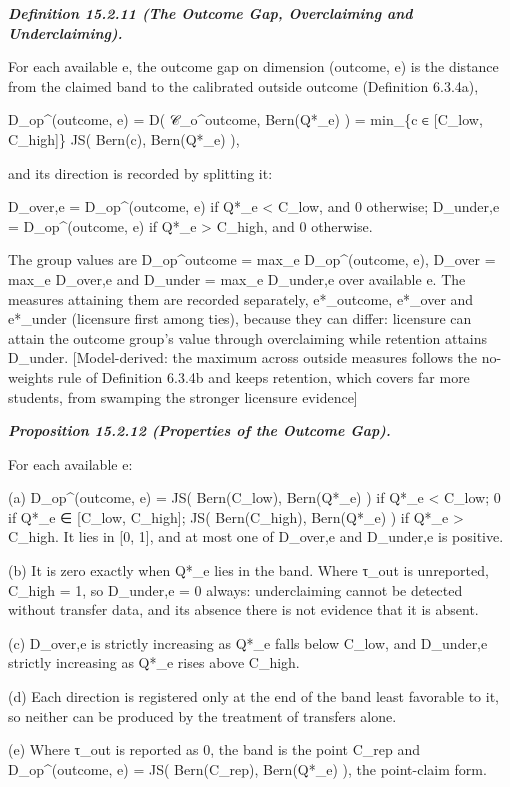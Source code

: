 \documentclass[
]{article}
\begin{document}
\emph{\textbf{Definition 15.2.11 (The Outcome Gap, Overclaiming and
Underclaiming).}}

For each available e, the outcome gap on dimension (outcome, e) is the
distance from the claimed band to the calibrated outside outcome
(Definition 6.3.4a),

D\_op\^{}(outcome, e) = D( 𝒞\_o\^{}outcome, Bern(Q*\_e) ) = min\_\{c ∈
{[}C\_low, C\_high{]}\} JS( Bern(c), Bern(Q*\_e) ),

and its direction is recorded by splitting it:

D\_over,e = D\_op\^{}(outcome, e) if Q*\_e \textless{} C\_low, and 0
otherwise; D\_under,e = D\_op\^{}(outcome, e) if Q*\_e \textgreater{}
C\_high, and 0 otherwise.

The group values are D\_op\^{}outcome = max\_e D\_op\^{}(outcome, e),
D\_over = max\_e D\_over,e and D\_under = max\_e D\_under,e over
available e. The measures attaining them are recorded separately,
e*\_outcome, e*\_over and e*\_under (licensure first among ties),
because they can differ: licensure can attain the outcome group's value
through overclaiming while retention attains D\_under. {[}Model-derived:
the maximum across outside measures follows the no-weights rule of
Definition 6.3.4b and keeps retention, which covers far more students,
from swamping the stronger licensure evidence{]}

\emph{\textbf{Proposition 15.2.12 (Properties of the Outcome Gap).}}

For each available e:

(a) D\_op\^{}(outcome, e) = JS( Bern(C\_low), Bern(Q*\_e) ) if Q*\_e
\textless{} C\_low; 0 if Q*\_e ∈ {[}C\_low, C\_high{]}; JS(
Bern(C\_high), Bern(Q*\_e) ) if Q*\_e \textgreater{} C\_high. It lies in
{[}0, 1{]}, and at most one of D\_over,e and D\_under,e is positive.

(b) It is zero exactly when Q*\_e lies in the band. Where τ\_out is
unreported, C\_high = 1, so D\_under,e = 0 always: underclaiming cannot
be detected without transfer data, and its absence there is not evidence
that it is absent.

(c) D\_over,e is strictly increasing as Q*\_e falls below C\_low, and
D\_under,e strictly increasing as Q*\_e rises above C\_high.

(d) Each direction is registered only at the end of the band least
favorable to it, so neither can be produced by the treatment of
transfers alone.

(e) Where τ\_out is reported as 0, the band is the point C\_rep and
D\_op\^{}(outcome, e) = JS( Bern(C\_rep), Bern(Q*\_e) ), the point-claim
form.
\end{document}
